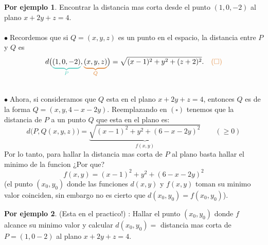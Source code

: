\documentclass{article}
\theoremstyle{definition}
\theoremstyle{definition}
\newtheorem*{ej}{Por ejemplo}
\theoremstyle{remark}
\newcommand\bl{$\bullet\;$}
\begin{document}
\begin{ej}
  Encontrar la distancia mas corta desde el punto $(1,0,-2)$ al plano $x+2y+z=4$. \\\\ 
\bl Recordemos que si $Q=(x,y,z)$ es un punto en el espacio, la distancia entre $P$ y $Q$ es \[
  d\big(\textcolor{verdep2}{\underbrace{\textcolor{black}{(1,0,-2)}}_{P}},\textcolor{rojop2}{\underbrace{\textcolor{black}{(x,y,z)}}_{Q}}\big)=\sqrt{(x-1)^2+y^2+(z+2)^2}. \quad \textcolor{rojop2}{(\square)}
\]\;
  \begin{figure}[h]
\centering
\def\svgwidth{0.55\textwidth}
\makebox[\textwidth]{
}
\end{figure} \\
\bl Ahora, si consideramos que $Q$ esta en el plano $x+2y+z=4$, entonces $Q$ es de la forma $Q=(x,y,4-x-2y)$. Reemplazando en \textcolor{rojop2}{$(\square)$} tenemos que la distancia de $P$ a un punto $Q$ que esta en el plano es: \[
  d\big(P,Q(x,y,z)\big)=\underbrace{\sqrt{(x-1)^2+y^2+(6-x-2y)^2}}_{f(x,y)} \quad \quad (\geq 0)
\]
Por lo tanto, para hallar la distancia mas corta de $P$ al plano basta hallar el minimo de la funcion \textcolor{rojop2}{¿Por que?} \[
f(x,y)=(x-1)^2+y^2+(6-x-2y)^2
\]\textcolor{rojop2}{\big(el punto $(x_0,y_0)$ donde las funciones $d(x,y)$ y $f(x,y)$ toman su minimo valor coinciden, sin embargo no es cierto que $d(x_0,y_0)=f(x_0,y_0)$\big).}
\end{ej}
\begin{ej}
  (Esta en el practico!) : Hallar el punto $(x_0,y_0)$ donde $f$ alcance su minimo valor y calcular $d(x_0,y_0)=$ distancia mas corta de $P=(1,0-2)$ al plano $x+2y+z=4$.
\end{ej}
\end{document}
